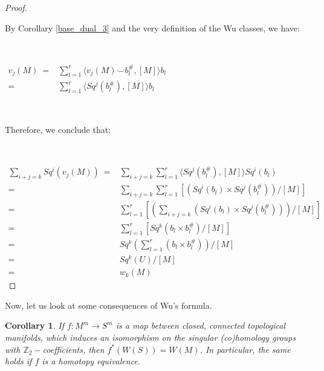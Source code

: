 \documentclass[12pt,oneside]{book}
\newtheorem{cor}    {Corollary}[chapter]
\newcommand{\ds}{\displaystyle}
\newcommand{\Z}{\mathbb{Z}}
\newcommand{\ccup}{\smile}
\begin{document}
    \begin{proof}

        \

        By Corollary \ref{base_dual_3} and the very definition of the Wu classes, we have:

        \
        
        $ \begin{array}{rl}
        	v_{j}(M) \ = & \ds\sum_{l=1}^{r} \langle v_{j}(M) \ccup b_{l}^{\#}, [M] \rangle b_{l} \\
        	= & \ds\sum_{l=1}^{r} \langle Sq^{j}(b_{l}^{\#}), [M] \rangle b_{l}
        \end{array} $

        \

        Therefore, we conclude that:

        \

        $ \begin{array}{rl}
        	\ds\sum_{i+j=k} Sq^{i}(v_{j}(M)) \ = & \ds\sum_{i+j=k} \ds\sum_{l=1}^{r} \langle Sq^{j}(b_{l}^{\#}), [M] \rangle Sq^{i}(b_{l}) \\
        	= & \ds\sum_{i+j=k} \ds\sum_{l=1}^{r} \left[ \left( Sq^{i}(b_{l}) \times Sq^{j}(b_{l}^{\#}) \right) / [M] \right] \\
        	= & \ds\sum_{l=1}^{r} \left[ \left( \ds\sum_{i+j=k} \left( Sq^{i}(b_{l}) \times Sq^{j}(b_{l}^{\#}) \right) \right) / [M] \right] \\
        	= & \ds\sum_{l=1}^{r} \left[ Sq^{k}(b_{l} \times b_{l}^{\#}) / [M] \right] \\
        	= & Sq^{k} \left( \ds\sum_{l=1}^{r} (b_{l} \times b_{l}^{\#}) \right) / [M] \\
        	= & Sq^{k}(U) / [M] \\
        	= & w_{k}(M)
        \end{array} $

    \end{proof}

    Now, let us look at some consequences of Wu's formula.

    \begin{cor}\label{ap_wu_1}
    	If $f: M^{m} \to S^{m}$ is a map between closed, connected topological manifolds, which induces an 
        isomorphism on the singular (co)homology groups with $\Z_{2}-$coefficients, then $f^{*}(W(S)) = W(M)$. In 
        particular, the same holds if $f$ is a homotopy equivalence.
    \end{cor}
\end{document}
